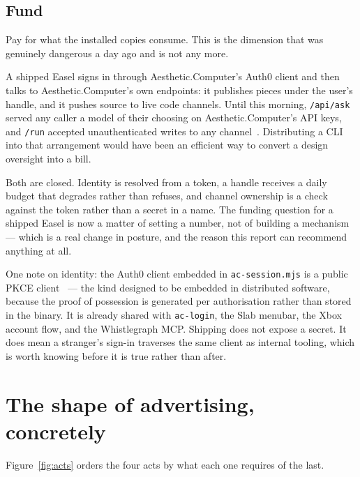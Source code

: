 \documentclass[10pt,letterpaper,twocolumn]{article}
\newcommand{\acdot}{{\color{acpink}.}}
\newcommand{\ac}{Aesthetic{\acdot}Computer}
\newcommand{\code}[1]{\texttt{#1}}
\begin{document}
\subsection{Fund}

Pay for what the installed copies consume. This is the dimension that was
genuinely dangerous a day ago and is not any more.

A shipped Easel signs in through \ac{}'s Auth0 client and then talks to \ac{}'s
own endpoints: it publishes pieces under the user's handle, and it pushes source
to live code channels. Until this morning, \code{/api/ask} served any caller a
model of their choosing on \ac{}'s API keys, and \code{/run} accepted
unauthenticated writes to any channel~\citep{scudder2026paying}. Distributing a
CLI into that arrangement would have been an efficient way to convert a design
oversight into a bill.

Both are closed. Identity is resolved from a token, a handle receives a daily
budget that degrades rather than refuses, and channel ownership is a check
against the token rather than a secret in a name. The funding question for a
shipped Easel is now a matter of setting a number, not of building a mechanism
--- which is a real change in posture, and the reason this report can recommend
anything at all.

One note on identity: the Auth0 client embedded in \code{ac-session.mjs} is a
public PKCE client~\citep{oauthpkce} --- the kind designed to be embedded in
distributed software, because the proof of possession is generated per
authorisation rather than stored in the binary. It is already shared with
\code{ac-login}, the Slab menubar, the Xbox account flow, and the
Whistlegraph MCP. Shipping does not expose a secret. It does mean a stranger's
sign-in traverses the same client as internal tooling, which is worth knowing
before it is true rather than after.

\section{The shape of advertising, concretely}

Figure~\ref{fig:acts} orders the four acts by what each one requires of the
last.
\end{document}
